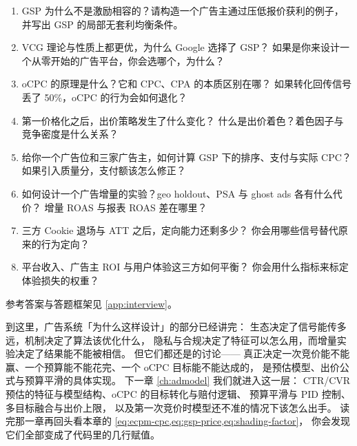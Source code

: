 \begin{interview}[本章对应的面试题]
\begin{enumerate}
  \item GSP 为什么不是激励相容的？请构造一个广告主通过压低报价获利的例子，
        并写出 GSP 的局部无套利均衡条件。
  \item VCG 理论与性质上都更优，为什么 Google 选择了 GSP？
        如果是你来设计一个从零开始的广告平台，你会选哪个，为什么？
  \item oCPC 的原理是什么？它和 CPC、CPA 的本质区别在哪？
        如果转化回传信号丢了 50\%，oCPC 的行为会如何退化？
  \item 第一价格化之后，出价策略发生了什么变化？
        什么是出价着色？着色因子与竞争密度是什么关系？
  \item 给你一个广告位和三家广告主，如何计算 GSP 下的排序、支付与实际 CPC？
        如果引入质量分，支付额该怎么修正？
  \item 如何设计一个广告增量的实验？geo holdout、PSA 与 ghost ads 各有什么代价？
        增量 ROAS 与报表 ROAS 差在哪里？
  \item 三方 Cookie 退场与 ATT 之后，定向能力还剩多少？
        你会用哪些信号替代原来的行为定向？
  \item 平台收入、广告主 ROI 与用户体验这三方如何平衡？
        你会用什么指标来标定体验损失的权重？
\end{enumerate}
参考答案与答题框架见 \cref{app:interview}。
\end{interview}

到这里，广告系统「为什么这样设计」的部分已经讲完：
生态决定了信号能传多远，机制决定了算法该优化什么，
隐私与合规决定了特征可以怎么用，而增量实验决定了结果能不能被相信。
但它们都还是的讨论——
真正决定一次竞价能不能赢、一个预算能不能花完、一个 oCPC 目标能不能达成的，
是预估模型、出价公式与预算平滑的具体实现。
下一章 \cref{ch:admodel} 我们就进入这一层：
CTR/CVR 预估的特征与模型结构、oCPC 的目标转化与赔付逻辑、
预算平滑与 PID 控制、多目标融合与出价上限，
以及第一次竞价时模型还不准的情况下该怎么出手。
读完那一章再回头看本章的 \cref{eq:ecpm-cpc,eq:gsp-price,eq:shading-factor}，
你会发现它们全部变成了代码里的几行赋值。
